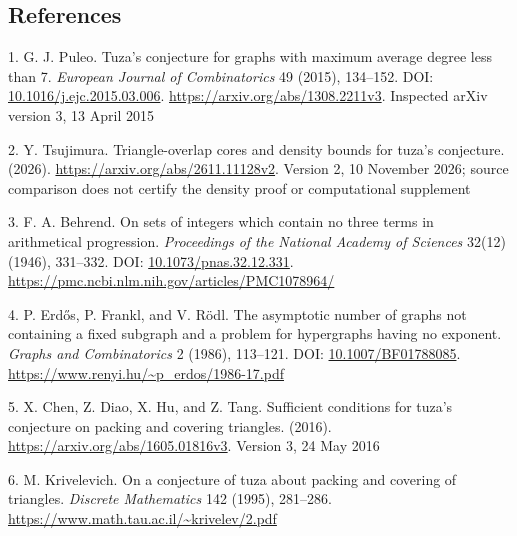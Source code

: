 \documentclass[11pt,a4paper]{article}
\newenvironment{CSLReferences}[2]{\par\setlength{\parindent}{0pt}\setlength{\parskip}{6pt}}{}
\begin{document}
\subsection*{References}\label{references}

\protect{}\label{refs}
\begin{CSLReferences}{0}{1}
\par{}\label{ref-puleo2015}
1. G. J. Puleo. Tuza's conjecture for graphs with maximum average degree less than 7. \emph{European Journal of Combinatorics} 49 (2015), 134--152. DOI: \href{https://doi.org/10.1016/j.ejc.2015.03.006}{10.1016/j.ejc.2015.03.006}. \url{https://arxiv.org/abs/1308.2211v3}. Inspected arXiv version 3, 13 April 2015

\par{}\label{ref-tsujimura2026v2}
2. Y. Tsujimura. Triangle-overlap cores and density bounds for tuza's conjecture. (2026). \url{https://arxiv.org/abs/2611.11128v2}. Version 2, 10 November 2026; source comparison does not certify the density proof or computational supplement

\par{}\label{ref-behrend1946}
3. F. A. Behrend. On sets of integers which contain no three terms in arithmetical progression. \emph{Proceedings of the National Academy of Sciences} 32(12) (1946), 331--332. DOI: \href{https://doi.org/10.1073/pnas.32.12.331}{10.1073/pnas.32.12.331}. \url{https://pmc.ncbi.nlm.nih.gov/articles/PMC1078964/}

\par{}\label{ref-erdosFranklRodl1986}
4. P. Erd\H{o}s, P. Frankl, and V. Rödl. The asymptotic number of graphs not containing a fixed subgraph and a problem for hypergraphs having no exponent. \emph{Graphs and Combinatorics} 2 (1986), 113--121. DOI: \href{https://doi.org/10.1007/BF01788085}{10.1007/BF01788085}. \url{https://www.renyi.hu/~p_erdos/1986-17.pdf}

\par{}\label{ref-chenDiaoHuTang2016}
5. X. Chen, Z. Diao, X. Hu, and Z. Tang. Sufficient conditions for tuza's conjecture on packing and covering triangles. (2016). \url{https://arxiv.org/abs/1605.01816v3}. Version 3, 24 May 2016

\par{}\label{ref-krivelevich1995}
6. M. Krivelevich. On a conjecture of tuza about packing and covering of triangles. \emph{Discrete Mathematics} 142 (1995), 281--286. \url{https://www.math.tau.ac.il/~krivelev/2.pdf}


\end{CSLReferences}
\end{document}
